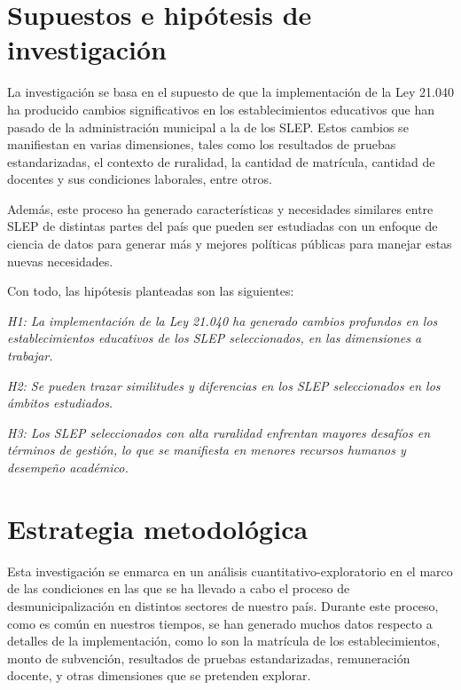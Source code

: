 \documentclass[
  12pt,
  letterpaper,
]{article}
\begin{document}
\newpage

\section{Supuestos e hipótesis de investigación}\label{supuestos-e-hipuxf3tesis-de-investigaciuxf3n}

La investigación se basa en el supuesto de que la implementación de la Ley 21.040 ha producido cambios significativos en los establecimientos educativos que han pasado de la administración municipal a la de los SLEP.
Estos cambios se manifiestan en varias dimensiones, tales como los resultados de pruebas estandarizadas, el contexto de ruralidad, la cantidad de matrícula, cantidad de docentes y sus condiciones laborales, entre otros.

Además, este proceso ha generado características y necesidades similares entre SLEP de distintas partes del país que pueden ser estudiadas con un enfoque de ciencia de datos para generar más y mejores políticas públicas para manejar estas nuevas necesidades.

Con todo, las hipótesis planteadas son las siguientes:

\emph{H1: La implementación de la Ley 21.040 ha generado cambios profundos en los establecimientos educativos de los SLEP seleccionados, en las dimensiones a trabajar.}

\emph{H2: Se pueden trazar similitudes y diferencias en los SLEP seleccionados en los ámbitos estudiados.}

\emph{H3: Los SLEP seleccionados con alta ruralidad enfrentan mayores desafíos en términos de gestión, lo que se manifiesta en menores recursos humanos y desempeño académico.}

\newpage

\section{Estrategia metodológica}\label{estrategia-metodoluxf3gica}

Esta investigación se enmarca en un análisis cuantitativo-exploratorio en el marco de las condiciones en las que se ha llevado a cabo el proceso de desmunicipalización en distintos sectores de nuestro país.
Durante este proceso, como es común en nuestros tiempos, se han generado muchos datos respecto a detalles de la implementación, como lo son la matrícula de los establecimientos, monto de subvención, resultados de pruebas estandarizadas, remuneración docente, y otras dimensiones que se pretenden explorar.
\end{document}
